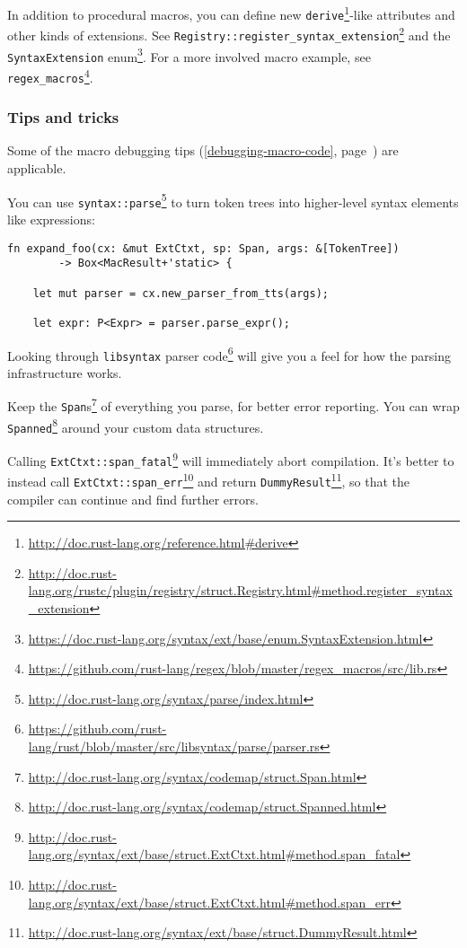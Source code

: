 \documentclass[a4paper,]{book}
\renewcommand*{\hyperref}[2][\ar]{%
  \def\ar{#2}%
  #2 (\autoref{#1}, page~\pageref{#1})}
\renewcommand{\href}[2]{#2\footnote{\url{#1}}}
\begin{document}
In addition to procedural macros, you can define new
\href{http://doc.rust-lang.org/reference.html\#derive}{\texttt{derive}}-like
attributes and other kinds of extensions. See
\href{http://doc.rust-lang.org/rustc/plugin/registry/struct.Registry.html\#method.register_syntax_extension}{\texttt{Registry::register\_syntax\_extension}}
and the
\href{https://doc.rust-lang.org/syntax/ext/base/enum.SyntaxExtension.html}{\texttt{SyntaxExtension}
enum}. For a more involved macro example, see
\href{https://github.com/rust-lang/regex/blob/master/regex_macros/src/lib.rs}{\texttt{regex\_macros}}.

\subsubsection{Tips and tricks}\label{tips-and-tricks}

Some of the \hyperref[debugging-macro-code]{macro debugging tips} are
applicable.

You can use
\href{http://doc.rust-lang.org/syntax/parse/index.html}{\texttt{syntax::parse}}
to turn token trees into higher-level syntax elements like expressions:

\begin{verbatim}
fn expand_foo(cx: &mut ExtCtxt, sp: Span, args: &[TokenTree])
        -> Box<MacResult+'static> {

    let mut parser = cx.new_parser_from_tts(args);

    let expr: P<Expr> = parser.parse_expr();
\end{verbatim}

Looking through
\href{https://github.com/rust-lang/rust/blob/master/src/libsyntax/parse/parser.rs}{\texttt{libsyntax}
parser code} will give you a feel for how the parsing infrastructure
works.

Keep the
\href{http://doc.rust-lang.org/syntax/codemap/struct.Span.html}{\texttt{Span}s}
of everything you parse, for better error reporting. You can wrap
\href{http://doc.rust-lang.org/syntax/codemap/struct.Spanned.html}{\texttt{Spanned}}
around your custom data structures.

Calling
\href{http://doc.rust-lang.org/syntax/ext/base/struct.ExtCtxt.html\#method.span_fatal}{\texttt{ExtCtxt::span\_fatal}}
will immediately abort compilation. It's better to instead call
\href{http://doc.rust-lang.org/syntax/ext/base/struct.ExtCtxt.html\#method.span_err}{\texttt{ExtCtxt::span\_err}}
and return
\href{http://doc.rust-lang.org/syntax/ext/base/struct.DummyResult.html}{\texttt{DummyResult}},
so that the compiler can continue and find further errors.
\end{document}
